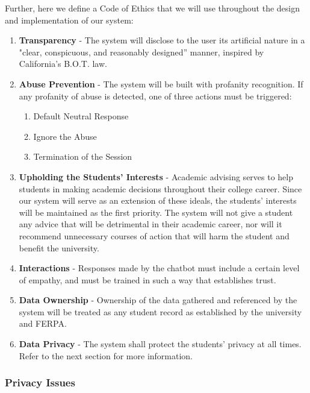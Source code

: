 \documentclass[titlepage, 12pt]{article}
\begin{document}
Further, here we define a Code of Ethics that we will use throughout the design and implementation of our system:

\begin{enumerate}
    \item \textbf{Transparency} - The system will disclose to the user its artificial nature in a "clear, conspicuous, and reasonably designed” manner, inspired by California’s B.O.T. law.
    \item \textbf{Abuse Prevention} - The system will be built with profanity recognition. If any profanity of abuse is detected, one of three actions must be triggered:
    
    \begin{enumerate}[label=(\alph*)]
        \item Default Neutral Response 
        \item Ignore the Abuse
        \item Termination of the Session
    \end{enumerate}

    \item \textbf{Upholding the Students’ Interests} - Academic advising serves to help students in making academic decisions throughout their college career. Since our system will serve as an extension of these ideals, the students’ interests will be maintained as the first priority. The system will not give a student any advice that will be detrimental in their academic career, nor will it recommend unnecessary courses of action that will harm the student and benefit the university.
    \item \textbf{Interactions} - Responses made by the chatbot must include a certain level of empathy, and must be trained in such a way that establishes trust.
    \item \textbf{Data Ownership} - Ownership of the data gathered and referenced by the system will be treated as any student record as established by the university and FERPA.
    \item \textbf{Data Privacy} - The system shall protect the students’ privacy at all times. Refer to the next section for more information.
\end{enumerate}

\subsubsection{Privacy Issues}
\end{document}

